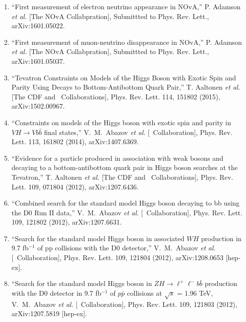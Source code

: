 \begin{enumerate}

\item ``First measurement of electron neutrino appearance in NOvA,''
P. Adamson {\it et al.} [The NOvA Collabpration],
Submittted to Phys. Rev. Lett.,
arXiv:1601.05022.

\item ``First measurement of muon-neutrino disappearance in NOvA,''
P. Adamson {\it et al.} [The NOvA Collabpration],
Submittted to Phys. Rev. Lett.,
arXiv:1601.05037.

\item ``Tevatron Constraints 
on Models of the Higgs Boson with Exotic Spin and Parity Using Decays 
to Bottom-Antibottom Quark Pair,'' T. Aaltonen {\it et al.} 
[The CDF and \dzero\ Collaborations], 
Phys. Rev. Lett. 114, 151802 (2015),
arXiv:1502.00967.


\item ``Constraints on models of the Higgs boson with exotic spin and parity in $VH\to Vb\bar{b}$ final states,''
V.~M.~Abazov {\it et al.}  [\dzero\ Collaboration],
Phys. Rev. Lett. 113, 161802 (2014),
arXiv:1407.6369.

\item ``Evidence for a particle produced in association with weak bosons and decaying to a 
        bottom-antibottom quark pair in Higgs boson searches at the Tevatron,''
T. Aaltonen {\it et al.} [The CDF and \dzero\ Collaborations],
Phys. Rev. Lett. 109, 071804 (2012),
arXiv:1207.6436.

\item ``Combined search for the standard model Higgs boson decaying to bb using the D0 Run II data,''
V.~M.~Abazov {\it et al.}  [\dzero\ Collaboration],
Phys. Rev. Lett. 109, 121802 (2012),
arXiv:1207.6631.

\item ``Search for the standard model Higgs boson in associated $WH$ production in 9.7 fb$^{-1}$
          of pp collisions with the D0 detector,''
V.~M.~Abazov {\it et al.}  [\dzero\ Collaboration],
Phys. Rev. Lett. 109, 121804 (2012),
arXiv:1208.0653 [hep-ex].

\item ``Search for the standard model Higgs boson in $ZH\to\ell^+\ell^- b{\bar b}$ production with the D0
          detector in 9.7 fb$^{-1}$ of $p{\bar p}$ collisions at $\sqrt{s}$ = 1.96 TeV,
V.~M.~Abazov {\it et al.}  [\dzero\ Collaboration],
Phys. Rev. Lett. 109, 121803 (2012),
arXiv:1207.5819 [hep-ex].


\end{enumerate}
